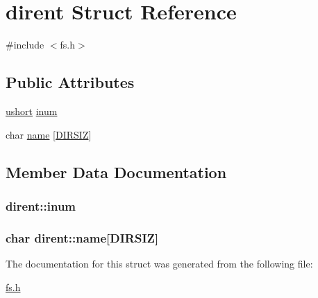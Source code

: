 \hypertarget{structdirent}{}\section{dirent Struct Reference}
\label{structdirent}


{\ttfamily \#include $<$fs.\+h$>$}

\subsection*{Public Attributes}
\begin{DoxyCompactItemize}
\item 
\hyperlink{types_8h_ab95f123a6c9bcfee6a343170ef8c5f69}{ushort} \hyperlink{structdirent_a68698c303a46d2a34232a2226629ac79}{inum}
\item 
char \hyperlink{structdirent_a4e08a84dbac9b9f6a3e006151855d14d}{name} \mbox{[}\hyperlink{fs_8h_a48246fb9e5cb7f6a71ebc9ebc2f06562}{D\+I\+R\+S\+IZ}\mbox{]}
\end{DoxyCompactItemize}


\subsection{Member Data Documentation}
\subsubsection[{\texorpdfstring{inum}{inum}}]{ dirent\+::inum}\hypertarget{structdirent_a68698c303a46d2a34232a2226629ac79}{}\label{structdirent_a68698c303a46d2a34232a2226629ac79}
\subsubsection[{\texorpdfstring{name}{name}}]{\setlength{\rightskip}{0pt plus 5cm}char dirent\+::name\mbox{[}{\bf D\+I\+R\+S\+IZ}\mbox{]}}\hypertarget{structdirent_a4e08a84dbac9b9f6a3e006151855d14d}{}\label{structdirent_a4e08a84dbac9b9f6a3e006151855d14d}


The documentation for this struct was generated from the following file\+:\begin{DoxyCompactItemize}
\item 
\hyperlink{fs_8h}{fs.\+h}\end{DoxyCompactItemize}
